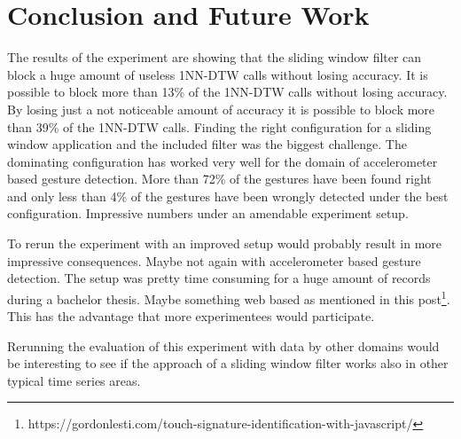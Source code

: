 \section{Conclusion and Future Work} \label{conclusion_and_future_work}
The results of the experiment are showing that the sliding window filter can block a huge amount of useless 1NN-DTW
calls without losing accuracy. It is possible to block more than 13\% of the 1NN-DTW calls without losing accuracy. By
losing just a not noticeable amount of accuracy it is possible to block more than 39\% of the 1NN-DTW calls. Finding the
right configuration for a sliding window application and the included filter was the biggest challenge. The dominating
configuration has worked very well for the domain of accelerometer based gesture detection. More than 72\% of the
gestures have been found right and only less than 4\% of the gestures have been wrongly detected under the best
configuration. Impressive numbers under an amendable experiment setup.

To rerun the experiment with an improved setup would probably result in more impressive consequences. Maybe not again
with accelerometer based gesture detection. The setup was pretty time consuming for a huge amount of records during a
bachelor thesis. Maybe something web based as mentioned in this
post\footnote{https://gordonlesti.com/touch-signature-identification-with-javascript/}. This has the advantage that more
experimentees would participate.

Rerunning the evaluation of this experiment with data by other domains would be interesting to see if the approach of a
sliding window filter works also in other typical time series areas.
